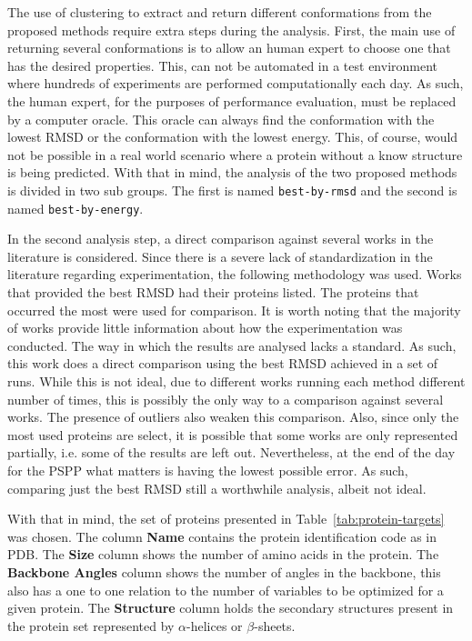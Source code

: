 The use of clustering to extract and return different conformations from the
proposed methods require extra steps during the analysis. First, the main use of
returning several conformations is to allow an human expert to choose one that
has the desired properties. This, can not be automated in a test environment where
hundreds of experiments are performed computationally each day. As such, the human
expert, for the purposes of performance evaluation, must be replaced by a
computer oracle. This oracle can always find the conformation with the lowest
RMSD or the conformation with the lowest energy. This, of course, would not
be possible in a real world scenario where a protein without a know structure is
being predicted. With that in mind, the analysis of the two proposed methods is
divided in two sub groups. The first is named \texttt{best-by-rmsd} and the second
is named \texttt{best-by-energy}.

In the second analysis step, a direct comparison against several works in the
literature is considered. Since there is a severe lack of standardization in the
literature regarding experimentation, the following methodology was used. Works
that provided the best RMSD had their proteins listed. The proteins that occurred
the most were used for comparison. It is worth noting that the majority of works
provide little information about how the experimentation was conducted. The way
in which the results are analysed lacks a standard. As such, this work does a
direct comparison using the best RMSD achieved in a set of runs. While this is
not ideal, due to different works running each method different number of times,
this is possibly the only way to a comparison against several works. The presence
of outliers also weaken this comparison. Also, since only the most used proteins
are select, it is possible that some works are only represented partially, i.e.
some of the results are left out. Nevertheless, at the end of the day for the
PSPP what matters is having the lowest possible error. As such, comparing just
the best RMSD still a worthwhile analysis, albeit not ideal.

With that in mind, the set of proteins presented in Table~\ref{tab:protein-targets}
was chosen. The column \textbf{Name} contains the protein identification code
as in PDB.  The \textbf{Size} column shows the number of amino acids in the protein.
The \textbf{Backbone Angles} column shows the number of angles in the backbone,
this also has a one to one relation to the number of variables to be optimized
for a given protein. The \textbf{Structure} column holds the secondary
structures present in the protein set represented by $\alpha$-helices or
$\beta$-sheets.

